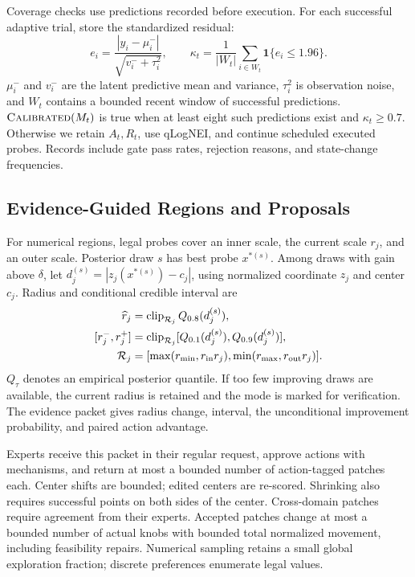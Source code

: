 \documentclass[runningheads]{llncs}
\begin{document}
Coverage checks use predictions recorded before execution. For each
successful adaptive trial, store the standardized residual:
\begin{equation}
 e_i=\frac{|y_i-\mu_i^-|}{\sqrt{v_i^-+\tau_i^2}},\qquad
 \kappa_t=\frac{1}{|W_t|}\sum_{i\in W_t}\mathbf1\{e_i\leq1.96\}.
 \label{eq:ct-calibration}
\end{equation}
$\mu_i^-$ and $v_i^-$ are the latent predictive mean and variance,
$\tau_i^2$ is observation noise, and $W_t$ contains a bounded recent window
of successful predictions. $\textsc{Calibrated}(M_t)$ is true when at least
eight such predictions exist and $\kappa_t\geq0.7$. Otherwise we retain
$A_t,R_t$, use qLogNEI, and continue scheduled executed probes. Records
include gate pass rates, rejection reasons, and state-change frequencies.

\subsection{Evidence-Guided Regions and Proposals}
\label{sec:feedback-adaptation}

For numerical regions, legal probes cover an inner scale, the current scale
$r_j$, and an outer scale. Posterior draw $s$ has best probe $x^{*(s)}$.
Among draws with gain above $\delta$, let
$d_j^{(s)}=|z_j(x^{*(s)})-c_j|$, using normalized coordinate $z_j$ and
center $c_j$. Radius and conditional credible interval are
\begin{equation}
\begin{aligned}
 \widehat r_j&=\operatorname{clip}_{\mathcal R_j}Q_{0.8}(d_j^{(s)}),\\
 [r_j^-,r_j^+]&=\operatorname{clip}_{\mathcal R_j}
                  [Q_{0.1}(d_j^{(s)}),Q_{0.9}(d_j^{(s)})],\\
 \mathcal R_j&=[\max(r_{\min},r_{\rm in}r_j),\min(r_{\max},r_{\rm out}r_j)].
\end{aligned}
\label{eq:ct-radius}
\end{equation}
$Q_\tau$ denotes an empirical posterior quantile. If too few improving
draws are available, the current radius is retained and the mode is marked
for verification. The evidence packet gives radius change, interval, the
unconditional improvement probability, and paired action advantage.

Experts receive this packet in their regular request, approve actions with
mechanisms, and return at most a bounded number of action-tagged patches
each. Center shifts are bounded; edited centers are re-scored. Shrinking
also requires successful points on both sides of the center. Cross-domain
patches require agreement from their experts. Accepted patches change at
most a bounded number of actual knobs with bounded total normalized
movement, including feasibility repairs. Numerical sampling retains a small
global exploration fraction; discrete preferences enumerate legal values.
\end{document}
